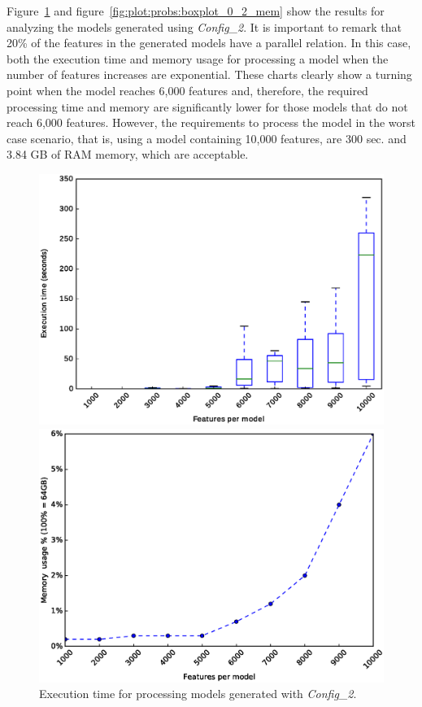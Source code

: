Figure~\ref{fig:plot:probs:boxplot_0_2} and figure~\ref{fig:plot:probs:boxplot_0_2_mem} show the results for analyzing the models generated using \textit{Config\_2}. It is important to remark that 20\% of the features in the generated models have a parallel relation. In this case, both the execution time and memory usage for processing a model when the number of features increases are exponential. These charts clearly show a turning point when the model reaches 6,000 features and, therefore, the required processing time and  memory are significantly lower for those models that do not reach 6,000 features. However, the requirements to process the model in the worst case scenario, that is, using a model containing 10,000 features, are 300 sec. and 3.84 GB of RAM memory, which are acceptable.

\begin{figure}[h]
	\centering
	\begin{minipage}[b]{0.48\textwidth}
		\includegraphics[width=\textwidth]{boxplot_0_2.eps}
		\caption{Execution time for processing models generated with \textit{Config\_2}.}\label{fig:plot:probs:boxplot_0_2}
	\end{minipage}
	\hfill
	\begin{minipage}[b]{0.48\textwidth}
		\includegraphics[width=\textwidth]{boxplot_mem.eps}

\end{minipage}
\end{figure}
